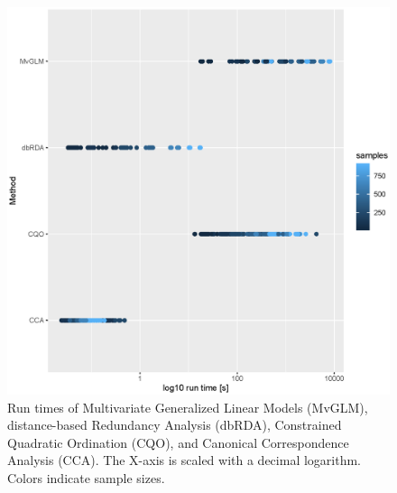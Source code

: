 \documentclass[a4paper,11pt]{article}
\begin{document}
    \begin{figure}[!htbp]
        \centering
        \includegraphics[scale =0.6]{figure6_runtime}
        \caption{
        Run times of Multivariate Generalized Linear Models (MvGLM), distance-based Redundancy Analysis (dbRDA), Constrained Quadratic Ordination (CQO), and Canonical Correspondence Analysis (CCA). The X-axis is scaled with a decimal logarithm. Colors indicate sample sizes.
        }
        \label{fig:runtime}
    \end{figure}{}

\end{document}
